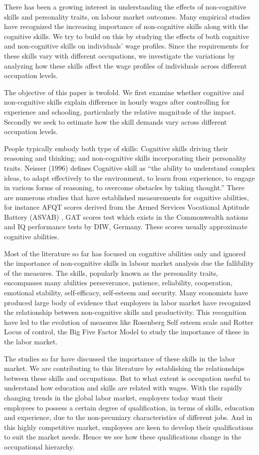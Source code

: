 \documentclass[11pt, a4paper, leqno]{article}
\begin{document}
There has been a growing interest in understanding the effects of non-cognitive skills and personality traits, on labour market outcomes. Many empirical studies have recognized the increasing importance of non-cognitive skills along with the cognitive skills. We try to build on this by studying the effects of both cognitive and non-cognitive skills on individuals’ wage profiles. Since the requirements for these skills vary with different occupations, we investigate the variations  by analyzing how these skills affect the wage profiles of individuals across different occupation levels.\par
The objective of this paper is twofold. We first examine whether cognitive and non-cognitive skills explain difference in hourly wages after controlling for experience and schooling, particularly the relative magnitude of the impact. Secondly we seek to estimate how the skill demands vary across different occupation levels. \par

People typically embody both type of skills: Cognitive skills driving their reasoning and thinking; and non-cognitive skills incorporating their personality traits.
Neisser (1996) defines Cognitive skill as “the ability to understand complex ideas, to adapt effectively to the environment, to learn from experience, to engage in various forms of reasoning, to overcome obstacles by taking thought.” There are numerous studies that have established measurements for cognitive abilities, for instance AFQT scores derived from the Armed Services Vocational Aptitude Battery (ASVAB) , GAT scores test which exists in the Commonwealth nations and IQ performance tests by DIW, Germany. These scores usually approximate cognitive abilities.\par
Most of the literature so far has focused on cognitive abilities only and ignored the importance of non-cognitive skills in labour market analysis due the fallibility of the measures. The skills, popularly known as the personality traits, encompasses many abilities perseverance, patience, reliability, cooperation, emotional stability, self-efficacy, self-esteem and security. Many economists have produced large body of evidence that employers in labor market have recognized the relationship between non-cognitive skills and productivity. This recognition have led to the evolution of measures like  Rosenberg Self esteem scale and Rotter Locus of control, the Big Five Factor Model to study the importance of these in the labor market. \par
The studies so far have discussed the importance of these skills in the labor market. We are contributing to this literature by establishing the relationships between these skills and occupations. But to what extent is occupation useful to understand how education and skills are related with wages. With the rapidly changing trends in the global labor market, employers today want their employees to possess a certain degree of qualification, in terms of skills, education and experience, due to the  non-pecuniary characteristics of different jobs. And in this highly competitive market, employees are keen to develop their qualifications to suit the market needs. Hence we see how these qualifications change in the occupational hierarchy.
\end{document}
